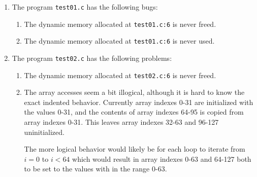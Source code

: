 \begin{enumerate}

\item The program \texttt{test01.c} has the following bugs:

\begin{enumerate}[label=Bug \#\arabic*)]
\item
The dynamic memory allocated at \texttt{test01.c:6} is never freed.
\item
The dynamic memory allocated at \texttt{test01.c:6} is never used.
\end{enumerate}

\item The program \texttt{test02.c} has the following problems:

\begin{enumerate}[label=Problem \#\arabic*)]
\item
The dynamic memory allocated at \texttt{test02.c:6} is never freed.
\item
The array accesses seem a bit illogical, although it is hard to know the exact indented behavior. Currently array indexes 0-31 are initialized with the values 0-31, and the contents of array indexes 64-95 is copied from array indexes 0-31. This leaves array indexes 32-63 and 96-127 uninitialized.

The more logical behavior would likely be for each loop to iterate from $i=0$ to $i<64$ which would result in array indexes 0-63 and 64-127 both to be set to the values with in the range 0-63.
\end{enumerate}

\end{enumerate}



